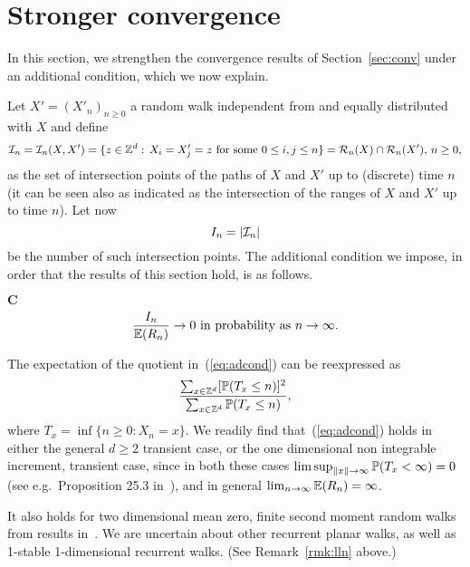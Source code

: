 
\section{Stronger convergence}
\label{sec:str}

\setcounter{equation}{0}

In this section, we strengthen the convergence results of Section~\ref{sec:conv} under an additional condition, 
which we now explain.

Let $X'=(X'_n)_{n\geq0}$ a random walk independent from and equally distributed with $X$ and define 
\begin{equation}
\label{eq:int} 
\I_n=\I_n(X,X')=\{z\in\Z^d:\,X_i=X'_j=z\mbox{ for some }0\leq i,j\leq n\}=\RR_n(X)\cap\RR_n(X'),\, n\geq0,
\end{equation}
as the set of intersection points of the paths of $X$ and $X'$ up to (discrete) time $n$ (it can be seen also as indicated as the intersection of the
ranges of $X$ and $X'$ up to time $n$). Let now
\begin{equation}
\label{eq:nint} 
I_n=|\I_n|
\end{equation}
be the number of such intersection points. The additional condition we impose, in order that the results
of this section hold, is as follows.

 $\mathbf C$
\begin{equation}
\label{eq:adcond} 
\frac{I_n}{\esp(R_n)}\to0\mbox{ in probability as }n\to\infty.
\end{equation}

\begin{rmk}
 \label{rmk:adcond}
The expectation of the quotient in~(\ref{eq:adcond}) can be reexpressed as
\begin{equation}
\label{eq:adcond1} 
\frac{\sum_{x\in\Z^d}[\P(T_x\leq n)]^2}{\sum_{x\in\Z^d}\P(T_x\leq n)},
\end{equation}
where $T_x=\inf\{n\geq0:X_n=x\}$. We readily find that~(\ref{eq:adcond}) holds in either the general $d\geq2$ transient case, 
or the one dimensional  non integrable increment, transient case,
since in both these cases $\limsup_{\|x\|\to\infty}\P(T_x<\infty)=0$ (see e.g.~Proposition 25.3 in~\cite{kn:S}), and in general
$\lim_{n\to\infty}\esp(R_n)=\infty$.

It also holds for two dimensional mean zero, finite second moment random walks from results in~\cite{kn:L}.
We are uncertain about other recurrent planar walks, as well as 1-stable 1-dimensional recurrent walks. 
(See Remark~\ref{rmk:lln} above.)
\end{rmk}


